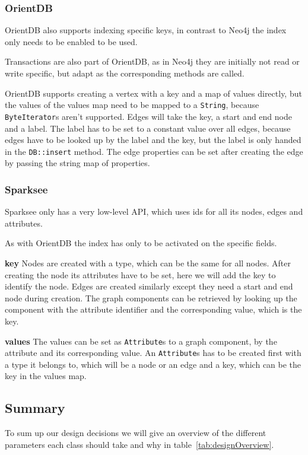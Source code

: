 \subsubsection{OrientDB}
OrientDB also supports indexing specific keys,
in contrast to Neo4j the index only needs to be enabled to be used.

Transactions are also part of OrientDB,
as in Neo4j they are initially not read or write specific,
but adapt as the corresponding methods are called.

OrientDB supports creating a vertex with a key and a map of values directly,
but the values of the values map need to be mapped to a \texttt{String},
because \texttt{ByteIterator}s aren't supported.
Edges will take the key, a start and end node and a label.
The label has to be set to a constant value over all edges,
because edges have to be looked up by the label and the key,
but the label is only handed in the \texttt{DB::insert} method.
The edge properties can be set after creating the edge by passing the string map of properties.

\subsubsection{Sparksee}
Sparksee only has a very low-level API,
which uses ids for all its nodes, edges and attributes.

As with OrientDB the index has only to be activated on the specific fields.

\textbf{key} \newline
Nodes are created with a type,
which can be the same for all nodes.
After creating the node its attributes have to be set,
here we will add the key to identify the node.
Edges are created similarly except they need a start and end node during creation.
The graph components can be retrieved by looking up the component with the attribute identifier and the corresponding value,
which is the key.

\textbf{values} \newline
The values can be set as \texttt{Attribute}s to a graph component,
by the attribute and its corresponding value.
An \texttt{Attribute}s has to be created first with a type it belongs to,
which will be a node or an edge and a key,
which can be the key in the values map.

\subsection{Summary}
\label{ch:design:se:summary}
To sum up our design decisions we will give an overview of the different parameters each class should take and why in table~\ref{tab:designOverview}.

